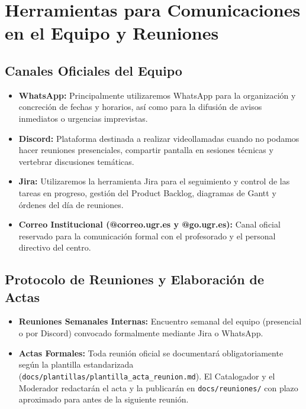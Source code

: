 \newpage
\section{Herramientas para Comunicaciones en el Equipo y Reuniones}

\subsection{Canales Oficiales del Equipo}
\begin{itemize}[leftmargin=*]
  \item \textbf{WhatsApp:} Principalmente utilizaremos WhatsApp para la organización y concreción de fechas y horarios, así como para la difusión de avisos inmediatos o urgencias imprevistas.
  \item \textbf{Discord:} Plataforma destinada a realizar videollamadas cuando no podamos hacer reuniones presenciales, compartir pantalla en sesiones técnicas y vertebrar discusiones temáticas.
  \item \textbf{Jira:} Utilizaremos la herramienta Jira para el seguimiento y control de las tareas en progreso, gestión del Product Backlog, diagramas de Gantt y órdenes del día de reuniones.
  \item \textbf{Correo Institucional (@correo.ugr.es y @go.ugr.es):} Canal oficial reservado para la comunicación formal con el profesorado y el personal directivo del centro.
\end{itemize}

\subsection{Protocolo de Reuniones y Elaboración de Actas}
\begin{itemize}[leftmargin=*]
  \item \textbf{Reuniones Semanales Internas:} Encuentro semanal del equipo (presencial o por Discord) convocado formalmente mediante Jira o WhatsApp.
  \item \textbf{Actas Formales:} Toda reunión oficial se documentará obligatoriamente según la plantilla estandarizada (\texttt{docs/plantillas/plantilla\_acta\_reunion.md}). El Catalogador y el Moderador redactarán el acta y la publicarán en \texttt{docs/reuniones/} con plazo aproximado para antes de la siguiente reunión.
\end{itemize}
